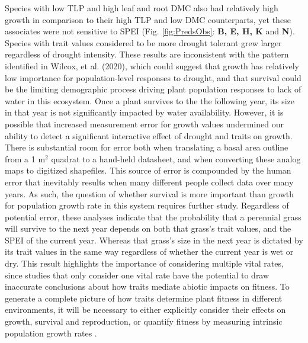 \documentclass[12pt, letterpaper]{article}
\begin{document}
Species with low TLP and high leaf and root DMC also had relatively high growth in comparison to their high TLP and low DMC counterparts, yet these associates were not sensitive to SPEI (Fig. \ref{fig:PredsObs}: \textbf{B, E, H, K} and \textbf{N}). Species with trait values considered to be more drought tolerant grew larger regardless of drought intensity. These results are inconsistent with the pattern identified in Wilcox, et al. (2020), which could suggest that growth has relatively low importance for population-level responses to drought, and that survival could be the limiting demographic process driving plant population responses to lack of water in this ecosystem. Once a plant survives to the the following year, its size in that year is not significantly impacted by water availability. However, it is possible that increased measurement error for growth values undermined our ability to detect a significant interactive effect of drought and traits on growth. There is substantial room for error both when translating a basal area outline from a 1 m$^2$ quadrat to a hand-held datasheet, and when converting these analog maps to digitized shapefiles. This source of error is compounded by the human error that inevitably results when many different people collect data over many years. As such, the question of whether survival is more important than growth for population growth rate in this system requires further study. Regardless of potential error, these analyses indicate that the probability that a perennial grass will survive to the next year depends on both that grass’s trait values, and the SPEI of the current year. Whereas that grass's size in the next year is dictated by its trait values in the same way regardless of whether the current year is wet or dry. This result highlights the importance of considering multiple vital rates, since studies that only consider one vital rate have the potential to draw inaccurate conclusions about how traits mediate abiotic impacts on fitness. To generate a complete picture of how traits determine plant fitness in different environments, it will be necessary to either explicitly consider their effects on growth, survival and reproduction, or quantify fitness by measuring intrinsic population growth rates \cite{Laughlin2020TheFitness}.
\end{document}
